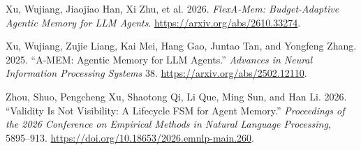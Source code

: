 \documentclass[
  11pt,
]{article}
\newlength{\cslhangindent}
\newenvironment{CSLReferences}[2] %
 {\begin{list}{}{%
  \setlength{\itemindent}{0pt}
  \setlength{\leftmargin}{0pt}
  \setlength{\parsep}{0pt}
  \ifodd #1
   \setlength{\leftmargin}{\cslhangindent}
   \setlength{\itemindent}{-1\cslhangindent}
  \fi
  \setlength{\itemsep}{#2\baselineskip}}}
 {\end{list}}
\begin{document}
\begin{CSLReferences}{1}{1}
Xu, Wujiang, Jiaojiao Han, Xi Zhu, et al. 2026. \emph{{FlexA-Mem}:
Budget-Adaptive Agentic Memory for LLM Agents}.
\url{https://arxiv.org/abs/2610.33274}.

Xu, Wujiang, Zujie Liang, Kai Mei, Hang Gao, Juntao Tan, and Yongfeng
Zhang. 2025. {``{A-MEM}: Agentic Memory for LLM Agents.''}
\emph{Advances in Neural Information Processing Systems} 38.
\url{https://arxiv.org/abs/2502.12110}.

Zhou, Shuo, Pengcheng Xu, Shaotong Qi, Li Que, Ming Sun, and Han Li.
2026. {``Validity Is Not Visibility: A Lifecycle FSM for Agent
Memory.''} \emph{Proceedings of the 2026 Conference on Empirical Methods
in Natural Language Processing}, 5895--913.
\url{https://doi.org/10.18653/2026.emnlp-main.260}.

\end{CSLReferences}
\end{document}
